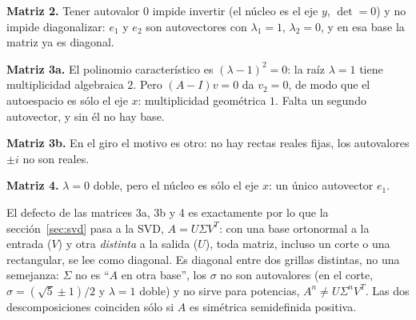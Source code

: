 \begin{resultado}
\textbf{Matriz 2.} Tener autovalor \(0\) impide invertir (el núcleo es el eje \(y\),
\(\det=0\)) y no impide diagonalizar: \(e_1\) y \(e_2\) son autovectores con
\(\lambda_1=1\), \(\lambda_2=0\), y en esa base la matriz ya es diagonal.

\textbf{Matriz 3a.} El polinomio característico es \((\lambda-1)^2=0\): la raíz
\(\lambda=1\) tiene multiplicidad algebraica \(2\). Pero \((A-I)v=0\) da \(v_2=0\), de modo
que el autoespacio es sólo el eje \(x\): multiplicidad geométrica \(1\). Falta un segundo
autovector, y sin él no hay base.

\textbf{Matriz 3b.} En el giro el motivo es otro: no hay rectas reales fijas, los
autovalores \(\pm i\) no son reales.

\textbf{Matriz 4.} \(\lambda=0\) doble, pero el núcleo es sólo el eje \(x\): un único
autovector \(e_1\).

El defecto de las matrices 3a, 3b y 4 es exactamente por lo que la sección~\ref{sec:svd}
pasa a la SVD, \(A=U\Sigma V^T\): con una base ortonormal a la entrada (\(V\)) y otra
\emph{distinta} a la salida (\(U\)), toda matriz, incluso un corte o una rectangular, se
lee como diagonal. Es diagonal entre dos grillas distintas, no una semejanza: \(\Sigma\) no
es ``\(A\) en otra base'', los \(\sigma\) no son autovalores (en el corte,
\(\sigma=(\sqrt5\pm1)/2\) y \(\lambda=1\) doble) y no sirve para potencias,
\(A^n\neq U\Sigma^nV^T\). Las dos descomposiciones coinciden sólo si \(A\) es simétrica
semidefinida positiva.
\end{resultado}
